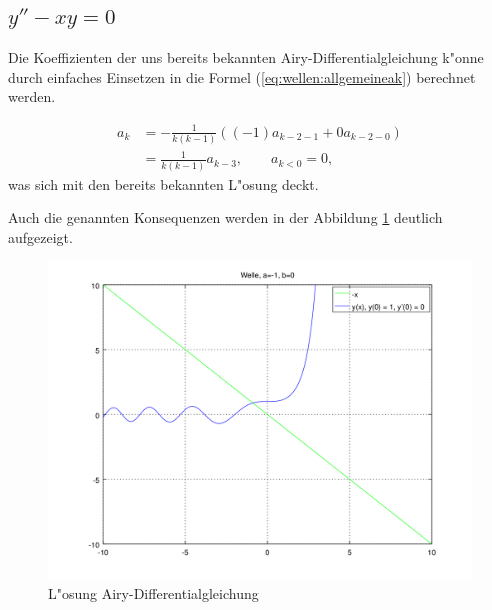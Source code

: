\subsection{\texorpdfstring{$y''-xy = 0$}{y''-xy = 0}}
Die Koeffizienten der uns bereits bekannten Airy-Differentialgleichung k"onne 
durch einfaches Einsetzen in die Formel (\ref{eq:wellen:allgemeineak}) 
berechnet werden.

\begin{equation*}
	\begin{split}
		a_k &= -\frac{1}{k(k-1)} ((-1) a_{k-2-1} + 
		0 a_{k-2-0})
		\\
		&= \frac{1}{k(k-1)} a_{k-3}, \qquad a_{k < 0} = 0,
	\end{split}
\end{equation*}
was sich mit den bereits bekannten L"osung deckt.

Auch die genannten Konsequenzen werden in der Abbildung 
\ref{fig:wellen:airy-dgl} deutlich aufgezeigt.

\begin{figure}
	\includegraphics[scale=0.65]{./wellen/images/allgemein/n1.png}
	\caption{L"osung Airy-Differentialgleichung}
	\label{fig:wellen:airy-dgl}
\end{figure}